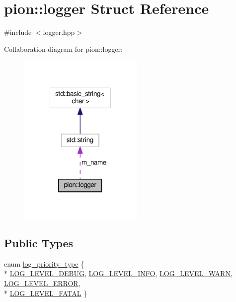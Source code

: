 \hypertarget{structpion_1_1logger}{\section{pion\-:\-:logger Struct Reference}
\label{structpion_1_1logger}
}


{\ttfamily \#include $<$logger.\-hpp$>$}



Collaboration diagram for pion\-:\-:logger\-:
\nopagebreak
\begin{figure}[H]
\begin{center}
\leavevmode
\includegraphics[width=170pt]{structpion_1_1logger__coll__graph}
\end{center}
\end{figure}
\subsection*{Public Types}
\begin{DoxyCompactItemize}
\item 
enum \hyperlink{structpion_1_1logger_a028e0caa7e4d190f0bbf629cd15456b8}{log\-\_\-priority\-\_\-type} \{ \\*
\hyperlink{structpion_1_1logger_a028e0caa7e4d190f0bbf629cd15456b8a36ae33c70511f0e2755ad24b009cd378}{L\-O\-G\-\_\-\-L\-E\-V\-E\-L\-\_\-\-D\-E\-B\-U\-G}, 
\hyperlink{structpion_1_1logger_a028e0caa7e4d190f0bbf629cd15456b8a469a91269377b34699eb188ca935dade}{L\-O\-G\-\_\-\-L\-E\-V\-E\-L\-\_\-\-I\-N\-F\-O}, 
\hyperlink{structpion_1_1logger_a028e0caa7e4d190f0bbf629cd15456b8aa53e46352ecd58083e2a70b5c37fc445}{L\-O\-G\-\_\-\-L\-E\-V\-E\-L\-\_\-\-W\-A\-R\-N}, 
\hyperlink{structpion_1_1logger_a028e0caa7e4d190f0bbf629cd15456b8a54e5ff73e35f679b488ed307d0d1ad99}{L\-O\-G\-\_\-\-L\-E\-V\-E\-L\-\_\-\-E\-R\-R\-O\-R}, 
\\*
\hyperlink{structpion_1_1logger_a028e0caa7e4d190f0bbf629cd15456b8aa3d4b8849e02f23d00e081703280a9e7}{L\-O\-G\-\_\-\-L\-E\-V\-E\-L\-\_\-\-F\-A\-T\-A\-L}
 \}
\end{DoxyCompactItemize}
